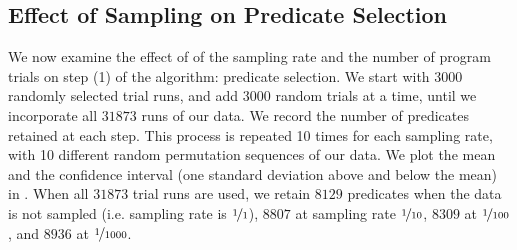 \subsection{Effect of Sampling on Predicate Selection}

We now examine the effect of of the sampling rate and the number of
program trials on step (1) of the algorithm: predicate selection.
We start with $3000$ randomly
selected trial runs, and add $3000$ random trials at a time, until we
incorporate all $31873$ runs of our data.  We record the number of
predicates retained at each step.  This process is repeated 10 times
for each sampling rate, with 10 different random permutation sequences
of our data. We plot the mean and the confidence interval (one
standard deviation above and below the mean) in
.  When all $31873$ trial
runs are used, we retain $8129$ predicates when the data is not
sampled (i.e. sampling rate is $\nicefrac{1}{1}$), $8807$ at sampling
rate $\nicefrac{1}{10}$, $8309$ at $\nicefrac{1}{100}$, and $8936$ at
$\nicefrac{1}{1000}$.

